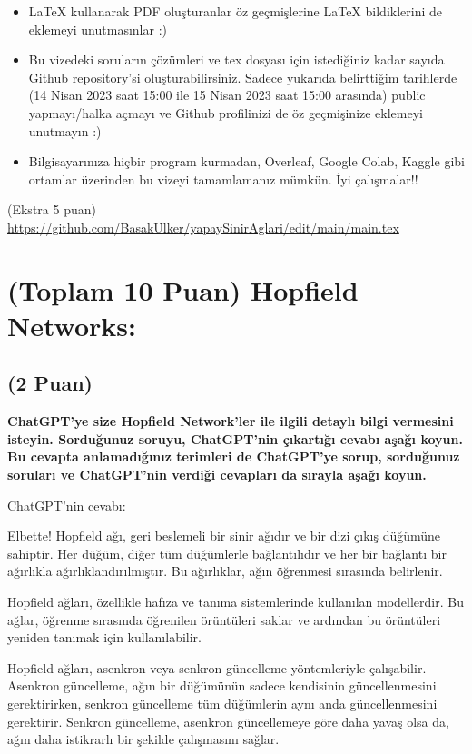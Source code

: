 \documentclass[11pt]{article}
\begin{document}
\begin{itemize}
    \item LaTeX kullanarak PDF oluşturanlar öz geçmişlerine LaTeX bildiklerini de eklemeyi unutmasınlar :)
    \item Bu vizedeki soruların çözümleri ve tex dosyası için istediğiniz kadar sayıda Github repository'si oluşturabilirsiniz. Sadece yukarıda belirttiğim tarihlerde (14 Nisan 2023 saat 15:00 ile 15 Nisan 2023 saat 15:00 arasında) public yapmayı/halka açmayı ve Github profilinizi de öz geçmişinize eklemeyi unutmayın :)
    \item Bilgisayarınıza hiçbir program kurmadan, Overleaf, Google Colab, Kaggle gibi ortamlar üzerinden bu vizeyi tamamlamanız mümkün. İyi çalışmalar!!
\end{itemize}

(Ekstra 5 puan) \url{https://github.com/BasakUlker/yapaySinirAglari/edit/main/main.tex}

\newpage
\section{(Toplam 10 Puan) Hopfield Networks:}

\subsection{(2 Puan)} \textbf{ChatGPT’ye size Hopfield Network’ler ile ilgili detaylı bilgi vermesini isteyin. Sorduğunuz soruyu, ChatGPT'nin çıkartığı cevabı aşağı koyun. Bu cevapta anlamadığınız terimleri de ChatGPT’ye sorup, sorduğunuz soruları ve ChatGPT’nin verdiği cevapları da sırayla aşağı koyun.}

ChatGPT'nin cevabı:

Elbette! Hopfield ağı, geri beslemeli bir sinir ağıdır ve bir dizi çıkış düğümüne sahiptir. Her düğüm, diğer tüm düğümlerle bağlantılıdır ve her bir bağlantı bir ağırlıkla ağırlıklandırılmıştır. Bu ağırlıklar, ağın öğrenmesi sırasında belirlenir.

Hopfield ağları, özellikle hafıza ve tanıma sistemlerinde kullanılan modellerdir. Bu ağlar, öğrenme sırasında öğrenilen örüntüleri saklar ve ardından bu örüntüleri yeniden tanımak için kullanılabilir.

Hopfield ağları, asenkron veya senkron güncelleme yöntemleriyle çalışabilir. Asenkron güncelleme, ağın bir düğümünün sadece kendisinin güncellenmesini gerektirirken, senkron güncelleme tüm düğümlerin aynı anda güncellenmesini gerektirir. Senkron güncelleme, asenkron güncellemeye göre daha yavaş olsa da, ağın daha istikrarlı bir şekilde çalışmasını sağlar.
\end{document}

